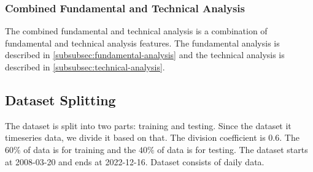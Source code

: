 \documentclass[../xlapes02]{subfiles}
\begin{document}
    \subsubsection{Combined Fundamental and Technical Analysis}\label{subsubsec:combined-fundamental-and-technical-analysis}
    The combined fundamental and technical analysis is a combination of fundamental and technical analysis features. The fundamental analysis is described in \cref{subsubsec:fundamental-analysis} and the technical analysis is described in \cref{subsubsec:technical-analysis}.

    \subsection{Dataset Splitting}\label{subsec:dataset-splitting}
    The dataset is split into two parts: training and testing. Since the dataset it timeseries data, we divide it based on that. The division coefficient is $0.6$.
    The $60\%$ of data is for training and the $40\%$ of data is for testing. The dataset starts at 2008-03-20 and ends at 2022-12-16.
    Dataset consists of daily data.
\end{document}

